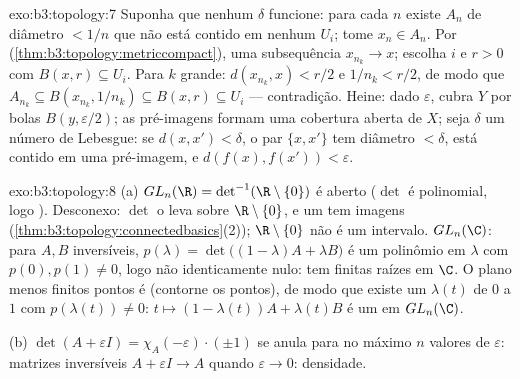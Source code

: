 \begin{solution}{exo:b3:topology:7}
Suponha que nenhum $\delta$ funcione: para cada $n$ existe $A_n$ de
diâmetro $< 1/n$ que não está contido em nenhum $U_i$; tome $x_n \in
A_n$. Por  (\cref{thm:b3:topology:metriccompact}),
uma subsequência $x_{n_k} \to x$; escolha $i$ e $r > 0$ com $B(x,
r) \subseteq U_i$. Para $k$ grande: $d(x_{n_k}, x) < r/2$ e
$1/n_k < r/2$, de modo que $A_{n_k} \subseteq B(x_{n_k}, 1/n_k)
\subseteq B(x, r) \subseteq U_i$ --- contradição. Heine:
dado $\varepsilon$, cubra $Y$ por bolas $B(y, \varepsilon/2)$;
as pré-imagens formam uma cobertura aberta de $X$; seja $\delta$ um
número de Lebesgue: se $d(x, x') < \delta$, o par $\{x, x'\}$
tem diâmetro $< \delta$, está contido em uma pré-imagem, e $d(f(x),
f(x')) < \varepsilon$.
\end{solution}

\begin{solution}{exo:b3:topology:8}
(a) $GL_n(\R) = \det^{-1}(\R\setminus\{0\})$ é aberto ($\det$ é
polinomial, logo ). Desconexo: $\det$ o leva sobre
$\R\setminus\{0\}$, e um  tem imagens
  (\cref{thm:b3:topology:connectedbasics}(2));
$\R\setminus\{0\}$ não é um intervalo. $GL_n(\C)$: para $A, B$
inversíveis, $p(\lambda) = \det\bigl((1-\lambda)A + \lambda
B\bigr)$ é um polinômio em $\lambda$ com $p(0), p(1) \neq 0$,
logo não identicamente nulo: tem finitas raízes em $\C$.
O plano menos finitos pontos é  (contorne
os pontos), de modo que existe um  $\lambda(t)$
de $0$ a $1$ com $p(\lambda(t)) \neq 0$: $t \mapsto
(1-\lambda(t))A + \lambda(t)B$ é um  em $GL_n(\C)$.

(b) $\det(A + \varepsilon I) = \chi_A(-\varepsilon)\cdot(\pm1)$
se anula para no máximo $n$ valores de $\varepsilon$: matrizes
inversíveis $A + \varepsilon I \to A$ quando $\varepsilon \to 0$:
densidade.
\end{solution}

